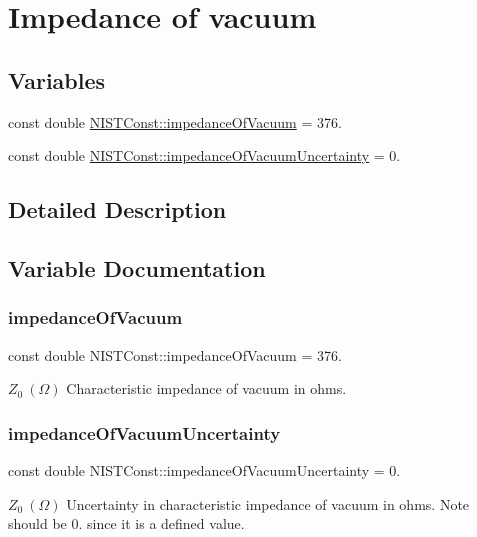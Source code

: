 \hypertarget{group___impedance_of_vacuum}{}\section{Impedance of vacuum}
\label{group___impedance_of_vacuum}
\subsection*{Variables}
\begin{DoxyCompactItemize}
\item 
const double \hyperlink{group___impedance_of_vacuum_ga51e1aede5d89041ea7423522b526dd0e}{N\+I\+S\+T\+Const\+::impedance\+Of\+Vacuum} = 376.
\item 
const double \hyperlink{group___impedance_of_vacuum_ga0d686b0016dc8c1f0bda161283b4f9c5}{N\+I\+S\+T\+Const\+::impedance\+Of\+Vacuum\+Uncertainty} = 0.
\end{DoxyCompactItemize}


\subsection{Detailed Description}


\subsection{Variable Documentation}
\mbox{\label{group___impedance_of_vacuum_ga51e1aede5d89041ea7423522b526dd0e}} 
\subsubsection{\texorpdfstring{impedance\+Of\+Vacuum}{impedanceOfVacuum}}
{\footnotesize\ttfamily const double N\+I\+S\+T\+Const\+::impedance\+Of\+Vacuum = 376.}

$Z_0 \ (\Omega)$ Characteristic impedance of vacuum in ohms. \mbox{\label{group___impedance_of_vacuum_ga0d686b0016dc8c1f0bda161283b4f9c5}} 
\subsubsection{\texorpdfstring{impedance\+Of\+Vacuum\+Uncertainty}{impedanceOfVacuumUncertainty}}
{\footnotesize\ttfamily const double N\+I\+S\+T\+Const\+::impedance\+Of\+Vacuum\+Uncertainty = 0.}

$Z_0 \ (\Omega)$ Uncertainty in characteristic impedance of vacuum in ohms. Note should be 0. since it is a defined value. 